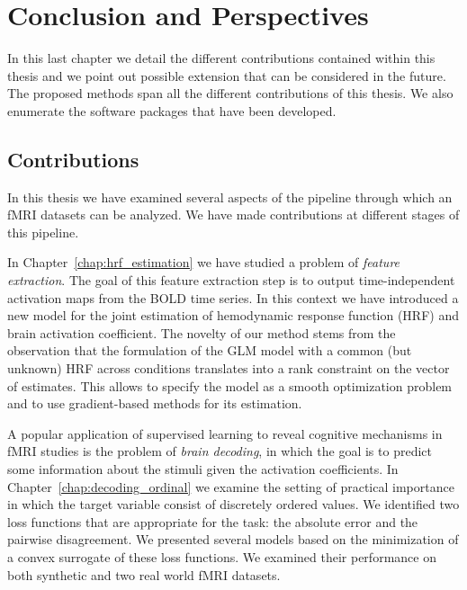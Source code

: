 
\chapter{Conclusion and Perspectives}\label{chap:conclusion}


\vspace*{\fill}

In this last chapter we detail the different contributions contained within this  thesis and we point out possible extension that can be considered in the future. The proposed methods span all the different contributions of this thesis. We also enumerate the software packages that have been developed. 

\vspace{10pt}
\minitoc

\vspace*{\fill}


\newpage

\section{Contributions}

In this thesis we have examined several aspects of the pipeline through which an fMRI datasets can be analyzed. We have made contributions at different stages of this pipeline.

In Chapter~\ref{chap:hrf_estimation} we have studied a problem of \emph{feature extraction}. The goal of this feature extraction step is to output \mbox{time-independent} activation maps from the BOLD time series. In this context we have introduced a new model for the joint estimation of hemodynamic response function (HRF) and brain activation coefficient. 
The novelty of our method stems from the observation that the formulation of the GLM model with a common (but unknown) HRF across conditions translates into a rank constraint on the vector of estimates. This allows to specify the model as a smooth optimization problem and to use gradient-based methods for its estimation.


A popular application of supervised learning to reveal cognitive mechanisms in fMRI studies is the problem of \emph{brain decoding}, in which the goal is to predict some information about the stimuli given the activation coefficients. In Chapter~\ref{chap:decoding_ordinal} we examine the setting of practical importance in which the target variable consist of discretely ordered values. We identified two loss functions that are appropriate for the task: the absolute error and the pairwise disagreement. We presented several models based on the minimization of a convex surrogate of these loss functions. We examined their performance on both synthetic and two real world fMRI datasets.


